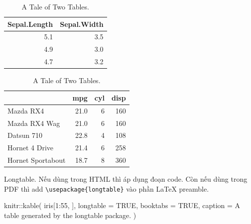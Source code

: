 \documentclass[
]{book}
\newenvironment{Shaded}{\begin{snugshade}}{\end{snugshade}}
\newcommand{\AttributeTok}[1]{\textcolor[rgb]{0.77,0.63,0.00}{#1}}
\newcommand{\ConstantTok}[1]{\textcolor[rgb]{0.00,0.00,0.00}{#1}}
\newcommand{\DecValTok}[1]{\textcolor[rgb]{0.00,0.00,0.81}{#1}}
\newcommand{\FunctionTok}[1]{\textcolor[rgb]{0.00,0.00,0.00}{#1}}
\newcommand{\NormalTok}[1]{#1}
\newcommand{\SpecialCharTok}[1]{\textcolor[rgb]{0.00,0.00,0.00}{#1}}
\newcommand{\StringTok}[1]{\textcolor[rgb]{0.31,0.60,0.02}{#1}}
\theoremstyle{definition}
\theoremstyle{definition}
\theoremstyle{definition}
\theoremstyle{definition}
\theoremstyle{remark}
\begin{document}
\begin{table}
\caption{\label{tab:table-multi}A Tale of Two Tables.}

\centering
\begin{tabular}[t]{rr}
\toprule
Sepal.Length & Sepal.Width\\
\midrule
5.1 & 3.5\\
4.9 & 3.0\\
4.7 & 3.2\\
\bottomrule
\end{tabular}
\centering
\begin{tabular}[t]{lrrr}
\toprule
  & mpg & cyl & disp\\
\midrule
Mazda RX4 & 21.0 & 6 & 160\\
Mazda RX4 Wag & 21.0 & 6 & 160\\
Datsun 710 & 22.8 & 4 & 108\\
Hornet 4 Drive & 21.4 & 6 & 258\\
Hornet Sportabout & 18.7 & 8 & 360\\
\bottomrule
\end{tabular}
\end{table}

Longtable. Nếu dùng trong HTML thì áp dụng đoạn code. Còn nếu dùng trong PDF thì add \texttt{\textbackslash{}usepackage\{longtable\}} vào phần LaTeX preamble.

\begin{Shaded}
\begin{Highlighting}[]
\NormalTok{knitr}\SpecialCharTok{::}\FunctionTok{kable}\NormalTok{(}
\NormalTok{  iris[}\DecValTok{1}\SpecialCharTok{:}\DecValTok{55}\NormalTok{, ], }\AttributeTok{longtable =} \ConstantTok{TRUE}\NormalTok{, }\AttributeTok{booktabs =} \ConstantTok{TRUE}\NormalTok{,}
  \AttributeTok{caption =} \StringTok{\textquotesingle{}A table generated by the longtable package.\textquotesingle{}}
\NormalTok{)}
\end{Highlighting}
\end{Shaded}
\end{document}
